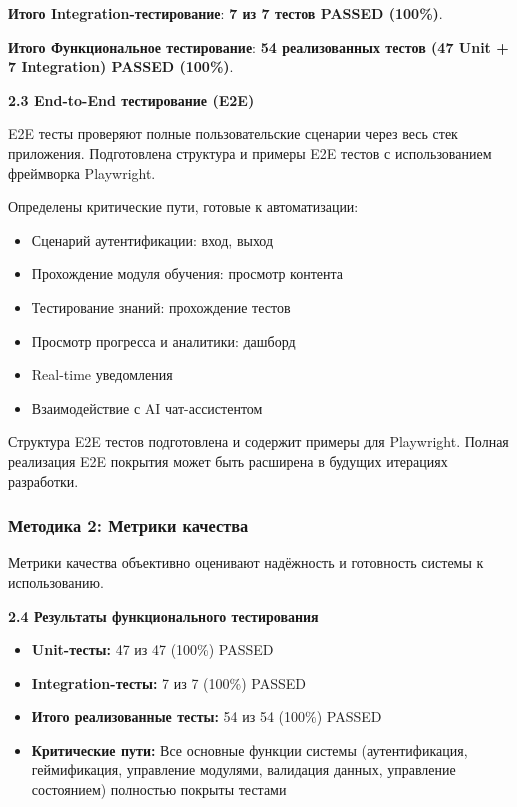 \textbf{Итого Integration-тестирование}: \textbf{7 из 7 тестов PASSED (100\%)}.

\textbf{Итого Функциональное тестирование}: \textbf{54 реализованных тестов (47 Unit + 7 Integration) PASSED (100\%)}.

\textbf{2.3 End-to-End тестирование (E2E)}

E2E тесты проверяют полные пользовательские сценарии через весь стек приложения. Подготовлена структура и примеры E2E тестов с использованием фреймворка Playwright.

Определены критические пути, готовые к автоматизации:
\begin{itemize}
	\item Сценарий аутентификации: вход, выход
	\item Прохождение модуля обучения: просмотр контента
	\item Тестирование знаний: прохождение тестов
	\item Просмотр прогресса и аналитики: дашборд
	\item Real-time уведомления
	\item Взаимодействие с AI чат-ассистентом
\end{itemize}

Структура E2E тестов подготовлена и содержит примеры для Playwright. Полная реализация E2E покрытия может быть расширена в будущих итерациях разработки.

\subsubsection*{Методика 2: Метрики качества}

Метрики качества объективно оценивают надёжность и готовность системы к использованию.

\textbf{2.4 Результаты функционального тестирования}

\begin{itemize}
	\item \textbf{Unit-тесты:} 47 из 47 (100\%) PASSED
	\item \textbf{Integration-тесты:} 7 из 7 (100\%) PASSED
	\item \textbf{Итого реализованные тесты:} 54 из 54 (100\%) PASSED
	\item \textbf{Критические пути:} Все основные функции системы (аутентификация, геймификация, управление модулями, валидация данных, управление состоянием) полностью покрыты тестами
\end{itemize}

